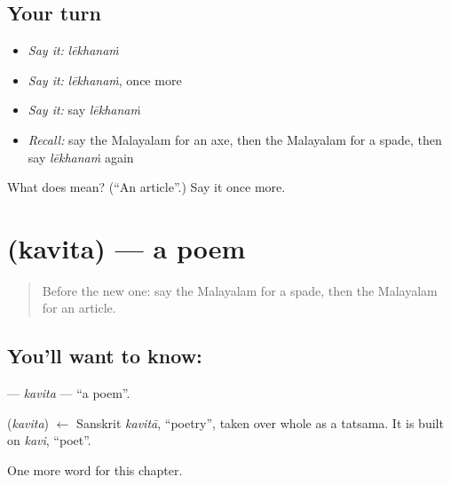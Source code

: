 \subsection*{Your turn}
\begin{itemize}
\raggedright
  \item \emph{Say it:} \emph{lēkhanaṁ}
  \item \emph{Say it:} \emph{lēkhanaṁ}, once more
  \item \emph{Say it:} say \emph{lēkhanaṁ}
  \item \emph{Recall:} say the Malayalam for an axe, then the Malayalam for a spade, then say \emph{lēkhanaṁ} again
\end{itemize}

\begin{tcolorbox}[breakable,colback=teal!4,colframe=teal!35!black,title={Before you move on}]
What does  mean? (\textquotedblleft{}An article\textquotedblright{}.) Say it once more.
\end{tcolorbox}
\section[\texorpdfstring{\ml{കവിത} (kavita)}{കവിത (kavita)}]{ (kavita) — a poem}

\label{lesson:ML-C329-kavita}



\begin{quote}
Before the new one: say the Malayalam for a spade, then the Malayalam for an article.
\end{quote}

\subsection*{You'll want to know: }
\textbf{} — \emph{kavita} — \textquotedblleft{}a poem\textquotedblright{}.

\begin{cousinweb}
\textbf{} (\emph{kavita}) $\leftarrow$ Sanskrit \emph{kavitā}, \textquotedblleft{}poetry\textquotedblright{}, taken over whole as a tatsama. It is built on \emph{kavi}, \textquotedblleft{}poet\textquotedblright{}.
\end{cousinweb}

\begin{grammarlens}[title={What you've built}]
One more word for this chapter.
\end{grammarlens}

